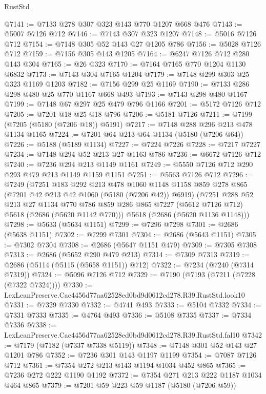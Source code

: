 \begin{lexlean}{RustStd}
\begin{coremodule}
@7141 := @7133 @278 @307 @323 @143 @770 @1207 @668 @476
@7143 := @5007 @7126 @712
@7146 := @7143 @307 @323 @1207
@7148 := @5016 @7126 @712
@7154 := @7148 @305 @52 @143 @27 @1205 @786
@7156 := @5028 @7126 @712
@7159 := @7156 @305 @143 @1205
@7164 := @6247 @7126 @712 @280 @143 @304
@7165 := @26 @323
@7170 := @7164 @7165 @770 @1204 @1130 @6832
@7173 := @7143 @304 @7165 @1204
@7179 := @7148 @299 @303 @25 @323 @1169 @1203
@7182 := @7156 @299 @25 @1169
@7190 := @7133 @286 @298 @480 @25 @770 @1167 @668 @493
@7193 := @7143 @298 @480 @1167
@7199 := @7148 @67 @297 @25 @479 @796 @1166
@7201 := @5172 @7126 @712
@7205 := @7201 @18 @25 @18 @796
@7206 := @5181 @7126
@7211 := @7199 (@7205 (@5180 (@7206 @18)) @5191)
@7217 := @7148 @288 @296 @213 @478 @1134 @1165
@7224 := @7201 @64 @213 @64 @1134 (@5180 (@7206 @64))
@7226 := @5188 (@5189 @1134)
@7227 := @7224 @7226
@7228 := @7217 @7227
@7234 := @7148 @294 @52 @213 @27 @1163 @786
@7236 := @6672 @7126 @712
@7240 := @7236 @294 @213 @1149 @1161
@7249 := @5550 @7126 @712 @290 @293 @479 @213 @1149 @1159 @1151
@7251 := @5563 @7126 @712
@7296 := @7249
    (@7251
      @183
      @292
      @213
      @478
      @1060
      @1148
      @1158
      @859
      @278
      @865
      (@7201 @42 @213 @42 @1060 (@5180 (@7206 @42)) @6919)
      (@7251
        @288
        @52
        @213
        @27
        @1134
        @770
        @786
        @859
        @286
        @865
        @7227
        (@5612 @7126 @712)
        @5618
        (@2686 (@5620 @1142 @770)))
      @5618
      (@2686 (@5620 @1136 @1148)))
@7298 := @5633 (@5634 @1151)
@7299 := @7296 @7298
@7301 := @2686 (@5638 @1151)
@7302 := @7299 @7301
@7304 := @2686 (@5643 @1151)
@7305 := @7302 @7304
@7308 := @2686 (@5647 @1151 @479)
@7309 := @7305 @7308
@7313 := @2686 (@5652 @290 @479 @213)
@7314 := @7309 @7313
@7319 := @2686 (@5114 (@5115 (@5658 @1151)) @712)
@7322 := @7234 (@7240 (@7314 @7319))
@7324 := @5096 @7126 @712
@7329 := @7190 (@7193 (@7211 (@7228 (@7322 @7324))))
@7330 := LexLeanPreserve.Cae4456d77aa62528ed0bd9d0612cd278.R39.RustStd.look10
@7331 := @7329 @7330
@7332 := @4741 @493
@7333 := @5104 @7332
@7334 := @7331 @7333
@7335 := @4764 @493
@7336 := @5108 @7335
@7337 := @7334 @7336
@7338 := LexLeanPreserve.Cae4456d77aa62528ed0bd9d0612cd278.R39.RustStd.fal10
@7342 := @7179 (@7182 (@7337 @7338 @5119))
@7348 := @7148 @301 @52 @143 @27 @1201 @786
@7352 := @7236 @301 @143 @1197 @1199
@7354 := @7087 @7126 @712
@7361 := @7354 @272 @213 @143 @1194 @1034 @452 @865
@7365 := @7236 @272 @222 @1190 @1192
@7372 := @7354 @271 @213 @222 @1187 @1034 @464 @865
@7379 := @7201 @59 @223 @59 @1187 (@5180 (@7206 @59))

\end{coremodule}
\end{lexlean}
